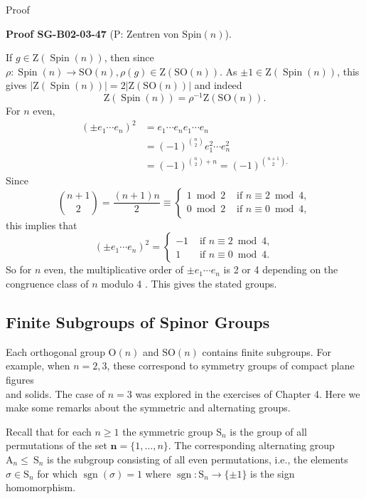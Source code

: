 \documentclass[10pt, letterpaper]{article}
\newcommand{\Spin}{\mathrm{Spin}}
\newcommand{\CustomHeading}[3]{%
  \par\medskip\noindent%
  \textbf{#1 #2} \textnormal{(#3)}.\enskip%
}
\newenvironment{PROOF}[2]{\begin{unitbox}\CustomHeading{Proof}{#1}{#2}}{\end{unitbox}}
\begin{document}
Proof


\begin{PROOF}{SG-B02-03-47}{P: Zentren von \(\Spin(n)\)}
If $g \in \mathrm{Z}(\operatorname{Spin}(n))$, then since $\rho: \operatorname{Spin}(n) \longrightarrow \mathrm{SO}(n), \rho(g) \in \mathrm{Z}(\mathrm{SO}(n))$. As $\pm 1 \in \mathrm{Z}(\operatorname{Spin}(n))$, this gives $|\mathrm{Z}(\operatorname{Spin}(n))|=2|\mathrm{Z}(\mathrm{SO}(n))|$ and indeed
$$
\mathrm{Z}(\operatorname{Spin}(n))=\rho^{-1} \mathrm{Z}(\mathrm{SO}(n)) .
$$
For $n$ even,
$$
\begin{aligned}
\left( \pm e_{1} \cdots e_{n}\right)^{2} & =e_{1} \cdots e_{n} e_{1} \cdots e_{n} \\
& =(-1)^{\binom{n}{2}} e_{1}^{2} \cdots e_{n}^{2} \\
& =(-1)^{\binom{n}{2}+n}=(-1)^{\binom{n+1}{2} .}
\end{aligned}
$$
Since
$$
\binom{n+1}{2}=\frac{(n+1) n}{2} \equiv \begin{cases}1 \bmod 2 & \text { if } n \equiv 2 \bmod 4, \\ 0 \bmod 2 & \text { if } n \equiv 0 \bmod 4,\end{cases}
$$
this implies that
$$
\left( \pm e_{1} \cdots e_{n}\right)^{2}=\left\{\begin{aligned}
-1 & \text { if } n \equiv 2 \bmod 4, \\
1 & \text { if } n \equiv 0 \bmod 4 .
\end{aligned}\right.
$$
So for $n$ even, the multiplicative order of $\pm e_{1} \cdots e_{n}$ is 2 or 4 depending on the congruence class of $n$ modulo 4 . This gives the stated groups.
\end{PROOF}



\pagebreak


\subsection{Finite Subgroups of Spinor Groups}

Each orthogonal group $\mathrm{O}(n)$ and $\mathrm{SO}(n)$ contains finite subgroups. For example, when $n=2,3$, these correspond to symmetry groups of compact plane figures\\
and solids. The case of $n=3$ was explored in the exercises of Chapter 4. Here we make some remarks about the symmetric and alternating groups.

Recall that for each $n \geqslant 1$ the symmetric group $\mathrm{S}_{n}$ is the group of all permutations of the set $\mathbf{n}=\{1, \ldots, n\}$. The corresponding alternating group $\mathrm{A}_{n} \leqslant \mathrm{~S}_{n}$ is the subgroup consisting of all even permutations, i.e., the elements $\sigma \in \mathrm{S}_{n}$ for which $\operatorname{sgn}(\sigma)=1$ where $\operatorname{sgn}: \mathrm{S}_{n} \longrightarrow\{ \pm 1\}$ is the sign homomorphism.
\end{document}
